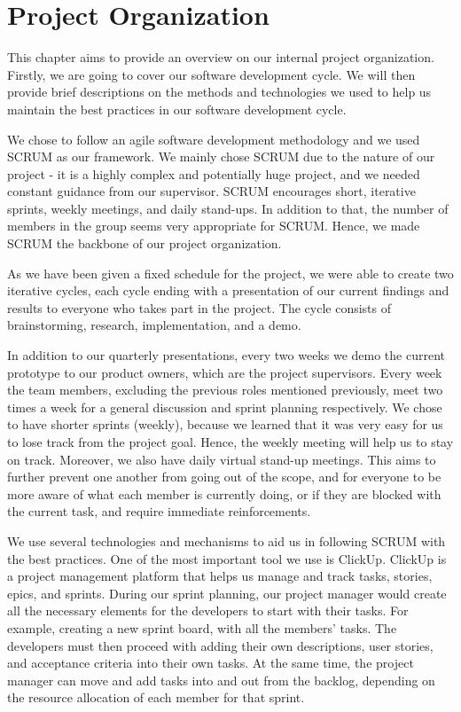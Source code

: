 \section{Project Organization}

This chapter aims to provide an overview on our internal project organization. Firstly, we are going to cover our software development cycle. We will then provide brief descriptions on the methods and technologies we used to help us maintain the best practices in our software development cycle.

We chose to follow an agile software development methodology and we used SCRUM as our framework. We mainly chose SCRUM due to the nature of our project - it is a highly complex and potentially huge project, and we needed constant guidance from our supervisor. SCRUM encourages short, iterative sprints, weekly meetings, and daily stand-ups. In addition to that, the number of members in the group seems very appropriate for SCRUM. Hence, we made SCRUM the backbone of our project organization.

As we have been given a fixed schedule for the project, we were able to create two iterative cycles, each cycle ending with a presentation of our current findings and results to everyone who takes part in the project. The cycle consists of brainstorming, research, implementation, and a demo.

In addition to our quarterly presentations, every two weeks we demo the current prototype to our product owners, which are the project supervisors. Every week the team members, excluding the previous roles mentioned previously, meet two times a week for a general discussion and sprint planning respectively. We chose to have shorter sprints (weekly), because we learned that it was very easy for us to lose track from the project goal. Hence, the weekly meeting will help us to stay on track. Moreover, we also have daily virtual stand-up meetings. This aims to further prevent one another from going out of the scope, and for everyone to be more aware of what each member is currently doing, or if they are blocked with the current task, and require immediate reinforcements.

We use several technologies and mechanisms to aid us in following SCRUM with the best practices. One of the most important tool we use is ClickUp. ClickUp is a project management platform that helps us manage and track tasks, stories, epics, and sprints. During our sprint planning, our project manager would create all the necessary elements for the developers to start with their tasks. For example, creating a new sprint board, with all the members' tasks. The developers must then proceed with adding their own descriptions, user stories, and acceptance criteria into their own tasks. At the same time, the project manager can move and add tasks into and out from the backlog, depending on the resource allocation of each member for that sprint.

